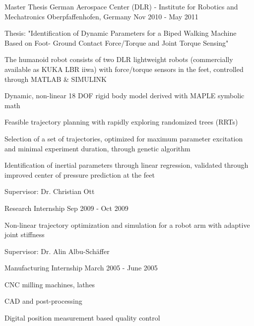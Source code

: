 \begin{cventries}
  \cventry
    {Master Thesis} %
    {German Aerospace Center (DLR) - Institute for Robotics and Mechatronics} %
    {Oberpfaffenhofen, Germany} %
    {Nov 2010 - May 2011} %
    {
      \begin{cvitems} %
      	\item{Thesis: "Identification of Dynamic Parameters for a Biped Walking Machine Based on Foot- Ground Contact Force/Torque and Joint Torque Sensing"}
        \item {The humanoid robot consists of two DLR lightweight robots (commercially available as KUKA LBR iiwa) with force/torque sensors in the feet, controlled through {MATLAB \& SIMULINK}}
        \item{Dynamic, non-linear 18 DOF rigid body model derived with MAPLE {symbolic math}}
        \item {Feasible trajectory planning with {rapidly exploring randomized trees (RRTs)}} 
        \item{Selection of a set of trajectories, optimized for maximum parameter excitation and minimal experiment duration, through genetic algorithm}
        \item {Identification of inertial parameters through linear regression, validated through improved center of pressure prediction at the feet}
        \item{Supervisor: Dr. Christian Ott}
      \end{cvitems}
      }

  \cventry
    {Research Internship} %
    { } %
    { } %
    {Sep 2009 - Oct 2009} %
    {
      \begin{cvitems} %
        \item {Non-linear trajectory optimization and simulation for a robot arm with adaptive joint stiffness
}
        \item {Supervisor: Dr. Alin Albu-Schäffer}        
      \end{cvitems}
    }

  \cventry
    {Manufacturing Internship} %
    { } %
    { } %
    {March 2005 - June 2005} %
    {
      \begin{cvitems} %
        \item {CNC milling machines, lathes}
        \item{CAD and post-processing}
        \item {Digital position measurement based quality control}
      \end{cvitems}
    }


\end{cventries}

